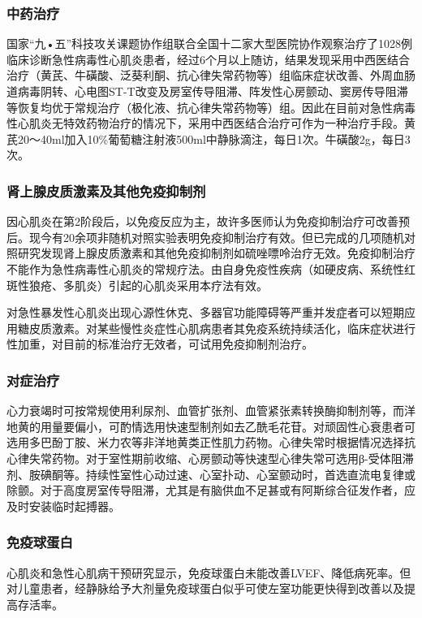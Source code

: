 \subsubsection{中药治疗}

国家“九•五”科技攻关课题协作组联合全国十二家大型医院协作观察治疗了1028例临床诊断急性病毒性心肌炎患者，经过6个月以上随访，结果发现采用中西医结合治疗（黄芪、牛磺酸、泛葵利酮、抗心律失常药物等）组临床症状改善、外周血肠道病毒阴转、心电图ST-T改变及房室传导阻滞、阵发性心房颤动、窦房传导阻滞等恢复均优于常规治疗（极化液、抗心律失常药物等）组。因此在目前对急性病毒性心肌炎无特效药物治疗的情况下，采用中西医结合治疗可作为一种治疗手段。黄芪20～40ml加入10\%葡萄糖注射液500ml中静脉滴注，每日1次。牛磺酸2g，每日3次。

\subsubsection{肾上腺皮质激素及其他免疫抑制剂}

因心肌炎在第2阶段后，以免疫反应为主，故许多医师认为免疫抑制治疗可改善预后。现今有20余项非随机对照实验表明免疫抑制治疗有效。但已完成的几项随机对照研究发现肾上腺皮质激素和其他免疫抑制剂如硫唑嘌呤治疗无效。免疫抑制治疗不能作为急性病毒性心肌炎的常规疗法。由自身免疫性疾病（如硬皮病、系统性红斑性狼疮、多肌炎）引起的心肌炎采用本疗法有效。

对急性暴发性心肌炎出现心源性休克、多器官功能障碍等严重并发症者可以短期应用糖皮质激素。对某些慢性炎症性心肌病患者其免疫系统持续活化，临床症状进行性加重，对目前的标准治疗无效者，可试用免疫抑制剂治疗。

\subsubsection{对症治疗}

心力衰竭时可按常规使用利尿剂、血管扩张剂、血管紧张素转换酶抑制剂等，而洋地黄的用量要偏小，可酌情选用快速型制剂如去乙酰毛花苷。对顽固性心衰患者可选用多巴酚丁胺、米力农等非洋地黄类正性肌力药物。心律失常时根据情况选择抗心律失常药物。对于室性期前收缩、心房颤动等快速型心律失常可选用β-受体阻滞剂、胺碘酮等。持续性室性心动过速、心室扑动、心室颤动时，首选直流电复律或除颤。对于高度房室传导阻滞，尤其是有脑供血不足甚或有阿斯综合征发作者，应及时安装临时起搏器。

\subsubsection{免疫球蛋白}

心肌炎和急性心肌病干预研究显示，免疫球蛋白未能改善LVEF、降低病死率。但对儿童患者，经静脉给予大剂量免疫球蛋白似乎可使左室功能更快得到改善以及提高存活率。

